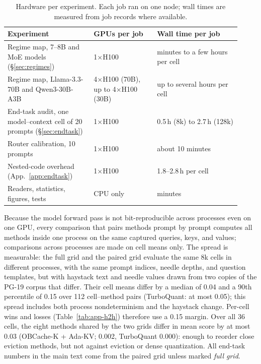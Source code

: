 \begin{table}[h]
\centering
\small
\setlength{\tabcolsep}{4pt}
\caption{Hardware per experiment.  Each job ran on one node; wall times are
measured from job records where available.}
\label{tab:app-compute}
\begin{tabular}{@{}p{0.34\linewidth}p{0.25\linewidth}p{0.33\linewidth}@{}}
\toprule
\textbf{Experiment} & \textbf{GPUs per job} & \textbf{Wall time per job} \\
\midrule
Regime map, 7--8B and MoE models (\S\ref{sec:regimes}) & 1$\times$H100 & minutes to a few hours per cell \\
Regime map, Llama-3.3-70B and Qwen3-30B-A3B & 4$\times$H100 (70B), up to 4$\times$H100 (30B) & up to several hours per cell \\
End-task audit, one model--context cell of 20 prompts (\S\ref{sec:endtask}) & 1$\times$H100 & 0.5\,h (8k) to 2.7\,h (128k) \\
Router calibration, 10 prompts & 1$\times$H100 & about 10 minutes \\
Nested-code overhead (App.~\ref{app:endtask}) & 1$\times$H100 & 1.8--2.8\,h per cell \\
Readers, statistics, figures, tests & CPU only & minutes \\
\bottomrule
\end{tabular}
\end{table}

Because the model forward pass is not bit-reproducible across processes even on
one GPU, every comparison that pairs methods prompt by prompt computes all
methods inside one process on the same captured queries, keys, and values;
comparisons across processes are made on cell means only.  The spread is
measurable: the full grid and the paired grid evaluate the same 8k cells in
different processes, with the same prompt indices, needle depths, and question
templates, but with haystack text and needle values drawn from two copies of
the PG-19 corpus that differ.
Their cell means differ by a median of 0.04 and a 90th percentile of 0.15 over
112 cell--method pairs (TurboQuant: at most 0.05); this spread includes both
process nondeterminism and the haystack change.  Per-cell wins and losses
(Table~\ref{tab:app-h2h}) therefore use a 0.15 margin.  Over all 36 cells, the
eight methods shared by the two grids differ in mean score by at most 0.03
(OBCache-K + Ada-KV; \sieve{} 0.002, TurboQuant 0.000): enough to reorder close
eviction methods, but not \sieve{} against eviction or dense quantization.
All end-task numbers in the main text come from the paired grid unless marked
\emph{full grid}.

